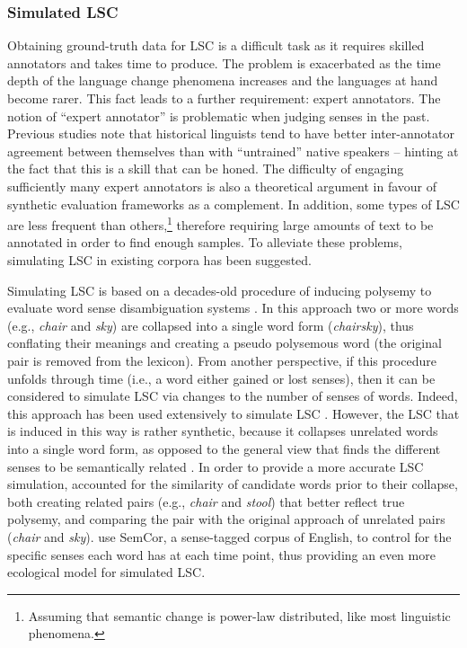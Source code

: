 \documentclass[output=paper]{langscibook}
\begin{document}
	
\subsubsection{Simulated LSC} 

Obtaining ground-truth data for LSC is a difficult task as it requires skilled annotators and takes time to produce. 
The problem is exacerbated as the time depth of the language change phenomena increases and the languages at hand become rarer. This fact leads to a further requirement: expert annotators. The notion of ``expert annotator'' is problematic when judging senses in the past. Previous studies \citep[e.g.][]{schlechtweg2018durel} note that historical linguists tend to have better inter-annotator agreement between themselves than with ``untrained'' native speakers -- hinting at the fact that this is a skill that can be honed. The difficulty of engaging sufficiently many expert annotators is also a theoretical argument in favour of synthetic evaluation frameworks as a complement.
In addition, some types of LSC are less frequent than others,\footnote{Assuming that semantic change is power-law distributed, like most linguistic phenomena.} 
therefore requiring large amounts of text to be annotated in order to find enough samples. To alleviate these problems, simulating LSC in existing corpora has been suggested.
 
 Simulating LSC is based on a decades-old procedure of inducing polysemy to evaluate word sense disambiguation systems \citep{gale1992, schutze1998}. 
 In this approach two or more words (e.g., \emph{chair} and \emph{sky}) are collapsed into a single word form (\emph{chairsky}), thus conflating their meanings and creating a pseudo polysemous word (the original pair is removed from the lexicon). 
 From another perspective, if this procedure unfolds through time (i.e., a word either gained or lost senses), then it can be considered to simulate LSC via changes to the number of senses of words. 
 Indeed, this approach has been used extensively to simulate LSC \citep{cook10, kulkarni2015statistically, rosenfeld-erk-2018-deep, shoemark-etal-2019-room}. 
 However, the LSC that is induced in this way is rather synthetic, because it collapses unrelated words into a single word form, as opposed to the general view that finds the different senses to be semantically related \citep{fillmore2000describing}. 
 In order to provide a more accurate LSC simulation, \citet{dubossarsky-etal-2019-time} accounted for the similarity of candidate words prior to their collapse, both creating related pairs (e.g., \emph{chair} and \emph{stool}) that better reflect true polysemy, and comparing the pair with the original approach of unrelated pairs (\emph{chair} and \emph{sky}). \citet{schlechtwegwalde20} use SemCor, a sense-tagged corpus of English, to control for the specific senses each word has at each time point, thus providing an even more ecological model for simulated LSC.
 
\end{document}
